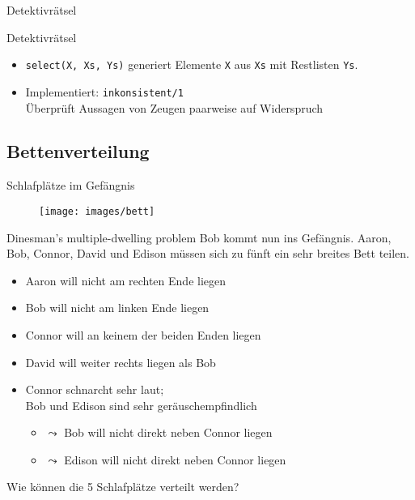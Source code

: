 \documentclass{beamer}
\begin{document}
\begin{frame}{Detektivrätsel}
\end{frame}

\begin{frame}{Detektivrätsel}
	
	\begin{itemize}
            \item \texttt{select(X, Xs, Ys)} generiert Elemente \texttt{X} aus \texttt{Xs} mit Restlisten \texttt{Ys}.
            \item Implementiert: \texttt{inkonsistent/1}\\
                  Überprüft Aussagen von Zeugen paarweise auf Widerspruch
	\end{itemize}
\end{frame}


\subsection{Bettenverteilung}

\begin{frame}{Schlafplätze im Gefängnis}
	\begin{figure}
		\texttt{[image: images/bett]}
	\end{figure}
\end{frame}

\begin{frame}{Dinesman's multiple-dwelling problem}
	Bob kommt nun ins Gefängnis.
	Aaron, Bob, Connor, David und Edison müssen sich zu fünft ein sehr breites Bett teilen.

	\begin{itemize}
		\item Aaron will nicht am rechten Ende liegen
		\item Bob will nicht am linken Ende liegen
		\item Connor will an keinem der beiden Enden liegen
		\item David will weiter rechts liegen als Bob
		\item Connor schnarcht sehr laut;\\Bob und Edison sind sehr geräuschempfindlich
		\begin{itemize}
			\item $\leadsto$ Bob will nicht direkt neben Connor liegen
			\item $\leadsto$ Edison will nicht direkt neben Connor liegen
		\end{itemize}
	\end{itemize}

	Wie können die 5 Schlafplätze verteilt werden?
\end{frame}
\end{document}
